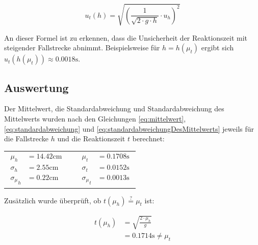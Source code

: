 \documentclass[a4paper,12pt]{article}
\begin{document}
\begin{equation}
    u_t(h) = \sqrt{\left(\frac{1}{\sqrt{2 \cdot g \cdot h}} \cdot u_h\right)^2}
\end{equation}

An dieser Formel ist zu erkennen, dass die Unsicherheit der Reaktionszeit mit steigender Fallstrecke abnimmt.
Beispielsweise für $h=h(\mu_t)$ ergibt sich $u_t(h(\mu_t)) \approx 0.0018\mathrm{s}$.


\subsection{Auswertung}

Der Mittelwert, die Standardabweichung und Standardabweichung des Mittelwerts wurden nach den
Gleichungen \ref{eq:mittelwert}, \ref{eq:standardabweichung} und \ref{eq:standardabweichungDesMittelwerts}
jeweils für die Fallstrecke $h$ und die Reaktionszeit $t$ berechnet:

\begin{table}[H]
    \centering
    \begin{tabular}{c c c}
        \parbox{4cm}{
            \begin{align*}
                \mu_h &= 14.42\mathrm{cm} \\
                \sigma_h &= 2.55\mathrm{cm} \\
                {\sigma_\mu}_h &= 0.22\mathrm{cm}
            \end{align*}
        } & \hspace{1cm} & \parbox{4cm}{
            \begin{align*}
                \mu_t &= 0.1708\mathrm{s} \\
                \sigma_t &= 0.0152\mathrm{s} \\
                {\sigma_\mu}_t &= 0.0013\mathrm{s}
            \end{align*}
        } \\
    \end{tabular}
\end{table}

Zusätzlich wurde überprüft, ob $t(\mu_h)\stackrel{?}{=}\mu_t$ ist:

\begin{align*}
    t(\mu_h) &= \sqrt{\frac{2 \cdot \mu_h}{g}} \\
    &= 0.1714\mathrm{s} \neq \mu_t
\end{align*}
\end{document}
